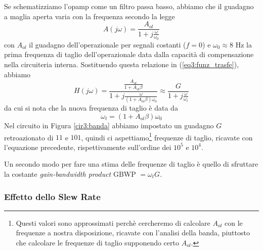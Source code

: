 Se schematizziamo l'opamp come un filtro passa basso, abbiamo che il guadagno a maglia aperta varia con la frequenza secondo la legge
\begin{equation}
A(j\omega)=\frac{A_{ol}}{1+j\frac{\omega}{\omega_0}}
\label{eq3:passa_basso}
\end{equation}
con $A_{ol}$ il guadagno dell'operazionale per segnali costanti ($f = 0$) e $\omega_0 \approx 8$ \si{\hertz} la prima frequenza di taglio dell'operazionale data dalla capacità di compensazione nella circuiteria interna. Sostituendo questa relazione in (\ref{eq3:funz_trasfe}), abbiamo
\begin{equation}
H(j\omega)=\frac{\frac{A_{ol}}{1+A_{ol}\beta}}{1+j \frac{\omega}{(1+A_{ol}\beta)\omega_0}} \approx \frac{G}{1+j\frac{\omega}{\omega_t}}
\label{eq3:funzione_trasferimento}
\end{equation}
da cui si nota che la nuova frequenza di taglio è data da
\begin{equation}
\omega_t=(1+A_{ol}\beta)\omega_0
\label{eq3:freq_taglio}
\end{equation}
Nel circuito in Figura \ref{cir3:banda} abbiamo impostato un guadagno $G$ retroazionato di $11$ e $101$, quindi ci aspettiamo\footnote{Questi valori sono approssimati perchè cercheremo di calcolare $A_{ol}$ con le frequenze a nostra disposizione, ricavate con l'analisi della banda, piuttosto che calcolare le frequenze di taglio supponendo certo $A_{ol}$.} frequenze di taglio, ricavate con l'equazione precedente, rispettivamente sull'ordine dei $10^5$ e $10^4$.

Un secondo modo per fare una stima delle frequenze di taglio è quello di sfruttare la costante \textit{gain-bandwidth product} GBWP $= \omega_t G$.

\subsubsection*{Effetto dello Slew Rate}

